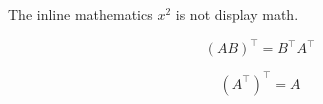 The inline mathematics $x^2$ is not display math.

\[
(A B)^\top = B^\top A^\top
\]

$$
(A^\top)^\top = A
$$
